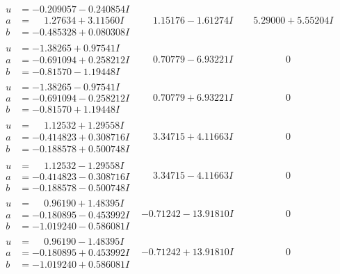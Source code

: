 \documentclass[1p]{elsarticle_modified}
\theoremstyle{definition}
\begin{document}
$$\begin{array}{c|c|c}
\begin{aligned}
u &= -0.209057 - 0.240854 I \\
a &= \phantom{-}1.27634 + 3.11560 I \\
b &= -0.485328 + 0.080308 I\end{aligned}
 & \phantom{-}1.15176 - 1.61274 I & \phantom{-}5.29000 + 5.55204 I \\ \hline\begin{aligned}
u &= -1.38265 + 0.97541 I \\
a &= -0.691094 + 0.258212 I \\
b &= -0.81570 - 1.19448 I\end{aligned}
 & \phantom{-}0.70779 - 6.93221 I & \phantom{-0.000000 } 0 \\ \hline\begin{aligned}
u &= -1.38265 - 0.97541 I \\
a &= -0.691094 - 0.258212 I \\
b &= -0.81570 + 1.19448 I\end{aligned}
 & \phantom{-}0.70779 + 6.93221 I & \phantom{-0.000000 } 0 \\ \hline\begin{aligned}
u &= \phantom{-}1.12532 + 1.29558 I \\
a &= -0.414823 + 0.308716 I \\
b &= -0.188578 + 0.500748 I\end{aligned}
 & \phantom{-}3.34715 + 4.11663 I & \phantom{-0.000000 } 0 \\ \hline\begin{aligned}
u &= \phantom{-}1.12532 - 1.29558 I \\
a &= -0.414823 - 0.308716 I \\
b &= -0.188578 - 0.500748 I\end{aligned}
 & \phantom{-}3.34715 - 4.11663 I & \phantom{-0.000000 } 0 \\ \hline\begin{aligned}
u &= \phantom{-}0.96190 + 1.48395 I \\
a &= -0.180895 - 0.453992 I \\
b &= -1.019240 - 0.586081 I\end{aligned}
 & -0.71242 - 13.91810 I & \phantom{-0.000000 } 0 \\ \hline\begin{aligned}
u &= \phantom{-}0.96190 - 1.48395 I \\
a &= -0.180895 + 0.453992 I \\
b &= -1.019240 + 0.586081 I\end{aligned}
 & -0.71242 + 13.91810 I & \phantom{-0.000000 } 0 \\ \hline\begin{aligned}

\end{aligned}
\end{array}$$
\end{document}
